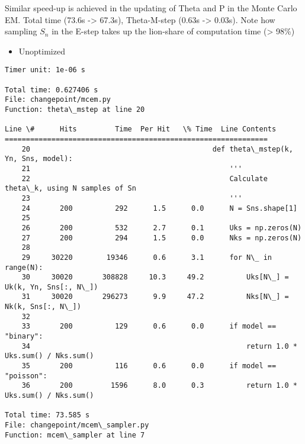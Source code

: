 \documentclass{article}
\begin{document}
    Similar speed-up is achieved in the updating of Theta and P in the Monte
Carlo EM. Total time (73.6s -\textgreater{} 67.3s), Theta-M-step (0.63s
-\textgreater{} 0.03s). Note how sampling $S_n$ in the E-step takes up
the lion-share of computation time (\textgreater{} 98\%)

    \begin{itemize}
\itemsep1pt\parskip0pt
\item
  Unoptimized
\end{itemize}


    \begin{Verbatim}[commandchars=\\\{\}]
Timer unit: 1e-06 s

Total time: 0.627406 s
File: changepoint/mcem.py
Function: theta\_mstep at line 20

Line \#      Hits         Time  Per Hit   \% Time  Line Contents
==============================================================
    20                                           def theta\_mstep(k, Yn, Sns, model):
    21                                               '''
    22                                               Calculate theta\_k, using N samples of Sn
    23                                               '''
    24       200          292      1.5      0.0      N = Sns.shape[1]
    25                                           
    26       200          532      2.7      0.1      Uks = np.zeros(N)
    27       200          294      1.5      0.0      Nks = np.zeros(N)
    28                                           
    29     30220        19346      0.6      3.1      for N\_ in range(N):
    30     30020       308828     10.3     49.2          Uks[N\_] = Uk(k, Yn, Sns[:, N\_])
    31     30020       296273      9.9     47.2          Nks[N\_] = Nk(k, Sns[:, N\_])
    32                                           
    33       200          129      0.6      0.0      if model == "binary":
    34                                                   return 1.0 * Uks.sum() / Nks.sum()
    35       200          116      0.6      0.0      if model == "poisson":
    36       200         1596      8.0      0.3          return 1.0 * Uks.sum() / Nks.sum()

Total time: 73.585 s
File: changepoint/mcem\_sampler.py
Function: mcem\_sampler at line 7


\end{Verbatim}
\end{document}
